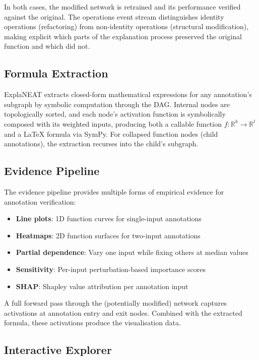 \documentclass[11pt]{article}
\begin{document}
In both cases, the modified network is retrained and its performance verified against the original. The operations event stream distinguishes identity operations (refactoring) from non-identity operations (structural modification), making explicit which parts of the explanation process preserved the original function and which did not.

\subsection{Formula Extraction}

ExplaNEAT extracts closed-form mathematical expressions for any annotation's subgraph by symbolic computation through the DAG. Internal nodes are topologically sorted, and each node's activation function is symbolically composed with its weighted inputs, producing both a callable function $f: \mathbb{R}^k \to \mathbb{R}^l$ and a \LaTeX{} formula via SymPy. For collapsed function nodes (child annotations), the extraction recurses into the child's subgraph.

\subsection{Evidence Pipeline}

The evidence pipeline provides multiple forms of empirical evidence for annotation verification:

\begin{itemize}
    \item \textbf{Line plots}: 1D function curves for single-input annotations
    \item \textbf{Heatmaps}: 2D function surfaces for two-input annotations
    \item \textbf{Partial dependence}: Vary one input while fixing others at median values
    \item \textbf{Sensitivity}: Per-input perturbation-based importance scores
    \item \textbf{SHAP}: Shapley value attribution per annotation input~\cite{lundberg2017unified}
\end{itemize}

A full forward pass through the (potentially modified) network captures activations at annotation entry and exit nodes. Combined with the extracted formula, these activations produce the visualisation data.

\subsection{Interactive Explorer}
\end{document}
